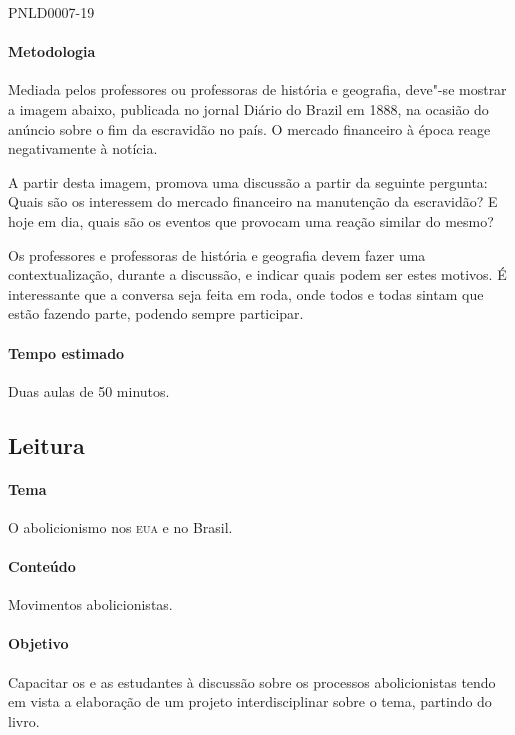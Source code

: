 \documentclass[11pt]{extarticle}
\begin{document}
 {PNLD0007-19}

\paragraph{Metodologia}

  Mediada pelos professores ou professoras de história e geografia, deve"-se mostrar a imagem abaixo,
  publicada no jornal Diário do Brazil em 1888, na ocasião do anúncio sobre o fim da escravidão no país.
  O mercado financeiro à época reage negativamente à notícia.
 

  A partir desta imagem, promova uma discussão a partir da seguinte pergunta: Quais são
  os interessem do mercado financeiro na manutenção da escravidão? E hoje em dia,
  quais são os eventos que provocam uma reação similar do mesmo?  

  Os professores e professoras de história e geografia devem fazer uma contextualização,
  durante a discussão, e indicar quais podem ser estes motivos. É interessante que a conversa
  seja feita em roda, onde todos e todas sintam que estão fazendo parte, podendo
  sempre participar.

  \paragraph{Tempo estimado} Duas aulas de 50 minutos.


\subsection{Leitura}

\paragraph{Tema} O abolicionismo nos \textsc{eua} e no Brasil.

\paragraph{Conteúdo} Movimentos abolicionistas.

\paragraph{Objetivo} Capacitar os e as estudantes à discussão sobre os processos abolicionistas
tendo em vista a elaboração de um projeto interdisciplinar sobre o tema, partindo do livro. 
\end{document}
